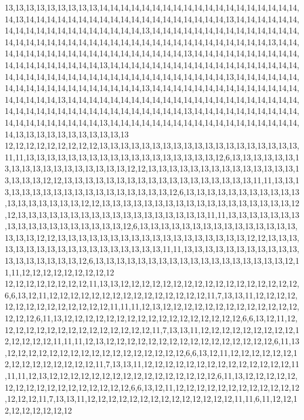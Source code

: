 13,13,13,13,13,13,13,13,13,14,14,14,14,14,14,14,14,14,14,14,14,14,14,14,14,14,14,14,14,13,14,14,14,14,14,14,14,14,14,14,14,14,14,14,14,14,14,14,14,13,14,14,14,14,14,14,14,14,14,14,14,14,14,14,14,14,14,14,14,13,14,14,14,14,14,14,14,14,14,14,14,14,14,14,14,14,14,14,14,14,14,14,14,14,14,14,14,14,14,14,14,14,14,14,14,14,14,14,14,13,14,14,14,14,14,14,14,14,14,14,14,14,14,14,14,14,14,14,14,13,14,14,14,14,14,14,14,14,14,14,14,14,14,14,14,14,14,14,14,13,14,14,14,14,14,14,14,14,14,14,14,14,14,14,14,14,14,14,14,14,14,14,14,14,14,14,14,14,14,14,14,14,14,14,14,14,14,14,14,13,14,14,14,14,14,14,14,14,14,14,14,14,14,14,14,14,14,14,14,13,14,14,14,14,14,14,14,14,14,14,14,14,14,14,14,14,14,14,14,13,14,14,14,14,14,14,14,14,14,14,14,14,14,14,14,14,14,14,14,14,14,14,14,14,14,14,14,14,14,14,14,14,14,14,14,14,14,14,14,13,14,14,14,14,14,14,14,14,14,14,14,14,14,14,14,14,14,14,14,13,14,14,14,14,14,14,14,14,14,14,14,14,14,14,14,14,14,14,14,13,13,13,13,13,13,13,13,13,13,13
12,12,12,12,12,12,12,12,12,13,13,13,13,13,13,13,13,13,13,13,13,13,13,13,13,13,13,13,11,11,13,13,13,13,13,13,13,13,13,13,13,13,13,13,13,13,13,13,12,6,13,13,13,13,13,13,13,13,13,13,13,13,13,13,13,13,13,13,12,12,13,13,13,13,13,13,13,13,13,13,13,13,13,13,13,13,13,13,12,12,13,13,13,13,13,13,13,13,13,13,13,13,13,13,13,13,13,13,11,11,13,13,13,13,13,13,13,13,13,13,13,13,13,13,13,13,13,13,12,6,13,13,13,13,13,13,13,13,13,13,13,13,13,13,13,13,13,13,12,12,13,13,13,13,13,13,13,13,13,13,13,13,13,13,13,13,13,13,12,12,13,13,13,13,13,13,13,13,13,13,13,13,13,13,13,13,13,13,11,11,13,13,13,13,13,13,13,13,13,13,13,13,13,13,13,13,13,13,12,6,13,13,13,13,13,13,13,13,13,13,13,13,13,13,13,13,13,13,12,12,13,13,13,13,13,13,13,13,13,13,13,13,13,13,13,13,13,13,12,12,13,13,13,13,13,13,13,13,13,13,13,13,13,13,13,13,13,13,11,11,13,13,13,13,13,13,13,13,13,13,13,13,13,13,13,13,13,13,12,6,13,13,13,13,13,13,13,13,13,13,13,13,13,13,13,13,13,13,12,11,11,12,12,12,12,12,12,12,12,12
12,12,12,12,12,12,12,12,11,13,13,12,12,12,12,12,12,12,12,12,12,12,12,12,12,12,12,12,6,6,13,12,11,12,12,12,12,12,12,12,12,12,12,12,12,12,12,12,11,7,13,13,11,12,12,12,12,12,12,12,12,12,12,12,12,12,12,11,11,11,12,13,12,12,12,12,12,12,12,12,12,12,12,12,12,12,12,12,6,11,13,12,12,12,12,12,12,12,12,12,12,12,12,12,12,12,12,12,6,6,13,12,11,12,12,12,12,12,12,12,12,12,12,12,12,12,12,12,11,7,13,13,11,12,12,12,12,12,12,12,12,12,12,12,12,12,12,11,11,11,12,13,12,12,12,12,12,12,12,12,12,12,12,12,12,12,12,12,6,11,13,12,12,12,12,12,12,12,12,12,12,12,12,12,12,12,12,12,6,6,13,12,11,12,12,12,12,12,12,12,12,12,12,12,12,12,12,12,11,7,13,13,11,12,12,12,12,12,12,12,12,12,12,12,12,12,12,11,11,11,12,13,12,12,12,12,12,12,12,12,12,12,12,12,12,12,12,12,6,11,13,12,12,12,12,12,12,12,12,12,12,12,12,12,12,12,12,12,6,6,13,12,11,12,12,12,12,12,12,12,12,12,12,12,12,12,12,12,11,7,13,13,11,12,12,12,12,12,12,12,12,12,12,12,12,12,12,11,11,6,11,12,12,12,12,12,12,12,12,12

